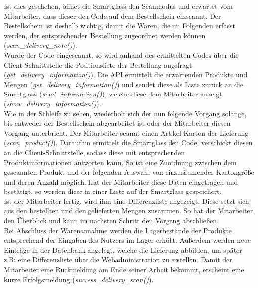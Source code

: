 Ist dies geschehen, öffnet die Smartglass den Scanmodus und erwartet vom Mitarbeiter, dass dieser den Code auf dem Bestellschein einscannt. Der Bestellschein ist deshalb wichtig, damit die Waren, die im Folgenden erfasst werden, der entsprechenden Bestellung zugeordnet werden können (\emph{scan\_delivery\_note()}).\\
Wurde der Code eingescannt, so wird anhand des ermittelten Codes über die Client-Schnittstelle die Positionsliste der Bestellung angefragt (\emph{get\_delivery\_information()}). Die API ermittelt die erwartenden Produkte und Mengen (\emph{get\_delivery\_information()}) und sendet diese als Liste zurück an die Smartglass (\emph{send\_information()}), welche diese dem Mitarbeiter anzeigt (\emph{show\_delivery\_information()}).\\

Wie in der Schleife zu sehen, wiederholt sich der nun folgende Vorgang solange, bis entweder der Bestellschein abgearbeitet ist oder der Mitarbeiter diesen Vorgang unterbricht. Der Mitarbeiter scannt einen Artikel \bzw Karton der Lieferung (\emph{scan\_product()}). Daraufhin ermittelt die Smartglass den Code, verschickt diesen an die Client-Schnittstelle, sodass diese mit entsprechenden Produktinformationen antworten kann. So ist eine Zuordnung zwischen dem gescannten Produkt und der folgenden Auswahl von einzuräumender Kartongröße und deren Anzahl möglich. Hat der Mitarbeiter diese Daten eingetragen und bestätigt, so werden diese in einer Liste auf der Smartglass gespeichert.\\

Ist der Mitarbeiter fertig, wird ihm eine Differenzliste angezeigt. Diese setzt sich aus den bestellten und den gelieferten Mengen zusammen. So hat der Mitarbeiter den Überblick und kann im nächsten Schritt den Vorgang abschließen.\\
Bei Abschluss der Warenannahme werden die Lagerbestände der Produkte entsprechend der Eingaben des Nutzers im Lager erhöht. Außerdem werden neue Einträge in der Datenbank angelegt, welche die Lieferung abbilden, um später z.B: eine Differenzliste über die Webadministration zu erstellen. Damit der Mitarbeiter eine Rückmeldung am Ende seiner Arbeit bekommt, erscheint eine kurze Erfolgsmeldung (\emph{success\_delivery\_scan()}).

